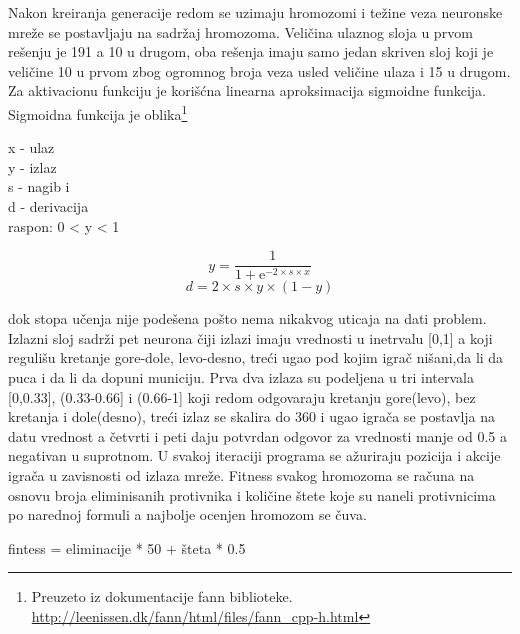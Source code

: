 \documentclass[a4paper]{article}
\begin{document}
\par Nakon kreiranja generacije redom se uzimaju hromozomi i težine veza neuronske mreže se postavljaju na sadržaj hromozoma. Veličina ulaznog sloja u prvom rešenju je 191 a 10 u drugom, oba rešenja imaju samo jedan skriven sloj koji je veličine 10 u prvom zbog ogromnog broja veza usled veličine ulaza i 15 u drugom. Za aktivacionu funkciju je korišćna linearna aproksimacija sigmoidne funkcija. Sigmoidna funkcija je oblika\footnote{Preuzeto iz dokumentacije fann biblioteke. \url{http://leenissen.dk/fann/html/files/fann_cpp-h.html}}
\begin{tcolorbox}
\begin{center}
x - ulaz \\
y - izlaz \\ 
s - nagib i \\
d - derivacija \\
raspon: 0 < y < 1 \\
\end{center}
\begin{equation}
y = \frac{1}{1 + \mathrm{e}^{-2 \times s \times x}}
\end{equation}
\begin{equation}
d = 2 \times s \times y \times (1 - y)
\end{equation}
\end{tcolorbox}
\noindent dok stopa učenja nije podešena pošto nema nikakvog uticaja na dati problem. Izlazni sloj sadrži pet neurona čiji izlazi imaju vrednosti u inetrvalu [0,1] a koji regulišu kretanje gore-dole, levo-desno, treći ugao pod kojim igrač nišani,da li da puca i da li da dopuni municiju. Prva dva izlaza su podeljena u tri intervala [0,0.33], (0.33-0.66] i (0.66-1] koji redom odgovaraju kretanju gore(levo), bez kretanja i dole(desno), treći izlaz se skalira do 360 i ugao igrača se postavlja na datu vrednost a četvrti i peti daju potvrdan odgovor za vrednosti manje od 0.5 a negativan u suprotnom. U svakoj iteraciji programa se ažuriraju pozicija i akcije igrača u zavisnosti od izlaza mreže. Fitness svakog hromozoma se računa na osnovu broja eliminisanih protivnika i količine štete koje su naneli protivnicima po narednoj formuli a najbolje ocenjen hromozom se čuva.
\begin{tcolorbox}
fintess = eliminacije * 50 + šteta * 0.5
\end{tcolorbox}
\end{document}
